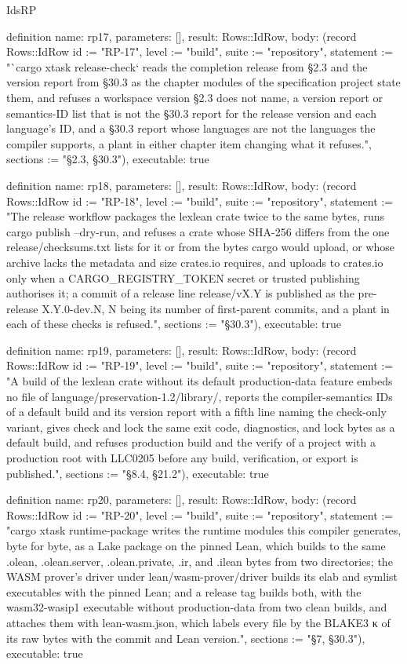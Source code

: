 \begin{lexlean}{IdsRP}
\begin{semanticmodule}
definition{
  name: rp17,
  parameters: [],
  result: Rows::IdRow,
  body: (record Rows::IdRow {id := "RP-17", level := "build", suite := "repository", statement := "`cargo xtask release-check` reads the completion release from §2.3 and the version report from §30.3 as the chapter modules of the specification project state them, and refuses a workspace version §2.3 does not name, a version report or semantics-ID list that is not the §30.3 report for the release version and each language's ID, and a §30.3 report whose languages are not the languages the compiler supports, a plant in either chapter item changing what it refuses.", sections := "§2.3, §30.3"}),
  executable: true
}

definition{
  name: rp18,
  parameters: [],
  result: Rows::IdRow,
  body: (record Rows::IdRow {id := "RP-18", level := "build", suite := "repository", statement := "The release workflow packages the lexlean crate twice to the same bytes, runs cargo publish --dry-run, and refuses a crate whose SHA-256 differs from the one release/checksums.txt lists for it or from the bytes cargo would upload, or whose archive lacks the metadata and size crates.io requires, and uploads to crates.io only when a CARGO_REGISTRY_TOKEN secret or trusted publishing authorises it; a commit of a release line release/vX.Y is published as the pre-release X.Y.0-dev.N, N being its number of first-parent commits, and a plant in each of these checks is refused.", sections := "§30.3"}),
  executable: true
}

definition{
  name: rp19,
  parameters: [],
  result: Rows::IdRow,
  body: (record Rows::IdRow {id := "RP-19", level := "build", suite := "repository", statement := "A build of the lexlean crate without its default production-data feature embeds no file of language/preservation-1.2/library/, reports the compiler-semantics IDs of a default build and its version report with a fifth line naming the check-only variant, gives check and lock the same exit code, diagnostics, and lock bytes as a default build, and refuses production build and the verify of a project with a production root with LLC0205 before any build, verification, or export is published.", sections := "§8.4, §21.2"}),
  executable: true
}

definition{
  name: rp20,
  parameters: [],
  result: Rows::IdRow,
  body: (record Rows::IdRow {id := "RP-20", level := "build", suite := "repository", statement := "cargo xtask runtime-package writes the runtime modules this compiler generates, byte for byte, as a Lake package on the pinned Lean, which builds to the same .olean, .olean.server, .olean.private, .ir, and .ilean bytes from two directories; the WASM prover's driver under lean/wasm-prover/driver builds its elab and symlist executables with the pinned Lean; and a release tag builds both, with the wasm32-wasip1 executable without production-data from two clean builds, and attaches them with lean-wasm.json, which labels every file by the BLAKE3 κ of its raw bytes with the commit and Lean version.", sections := "§7, §30.3"}),
  executable: true
}
\end{semanticmodule}
\end{lexlean}
